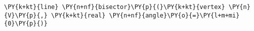 \begin{Verbatim}[commandchars=\\\{\}]
    \PY{k+kt}{line} \PY{n+nf}{bisector}\PY{p}{(}\PY{k+kt}{vertex} \PY{n}{V}\PY{p}{,} \PY{k+kt}{real} \PY{n+nf}{angle}\PY{o}{=}\PY{l+m+mi}{0}\PY{p}{)}
\end{Verbatim}
